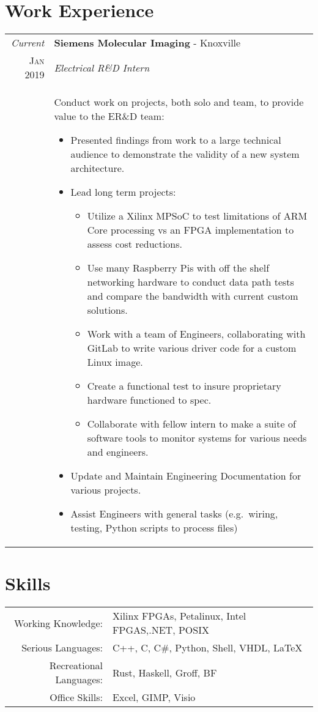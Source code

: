 \documentclass[a4paper,11pt]{article}
\begin{document}
\section{Work Experience}
\begin{tabularx}{\textwidth}{r|X}
   \emph{Current} & \textbf{Siemens Molecular Imaging} \-- Knoxville\\
   \textsc{Jan 2019} & \emph{Electrical R\&D Intern}\\
   & \small{Conduct work on projects, both solo and team, to provide value to the ER\&D team:
      \begin{itemize}[leftmargin=20pt,topsep=1pt,itemsep=0pt,partopsep=1pt, parsep=1pt]
         \item Presented findings from work to a large technical audience to demonstrate the validity of a new system architecture.
         \item Lead long term projects:
            \begin{itemize}[leftmargin=20pt,topsep=1pt,itemsep=0pt,partopsep=1pt, parsep=1pt]
               \item Utilize a Xilinx MPSoC to test limitations of ARM Core processing vs an FPGA implementation to assess cost reductions.
               \item Use many Raspberry Pis with off the shelf networking hardware to conduct data path tests and compare the bandwidth with current custom solutions.
               \item Work with a team of Engineers, collaborating with GitLab to write various driver code for a custom Linux image.
               \item Create a functional test to insure proprietary hardware functioned to spec.
               \item Collaborate with fellow intern to make a suite of software tools to monitor systems for various needs and engineers.
            \end{itemize}
         \item Update and Maintain Engineering Documentation for various projects.
         \item Assist Engineers with general tasks (e.g.\ wiring, testing, Python scripts to process files)
      \end{itemize}}\\
\end{tabularx}

\section{Skills}
\begin{tabularx}{\textwidth}{rl}
   Working Knowledge: & Xilinx FPGAs, Petalinux, Intel FPGAS,.NET, POSIX\\
   Serious Languages:& C++, C, C\#, Python, Shell, VHDL, \LaTeX{}\\
   Recreational Languages:& Rust, Haskell, Groff, BF \\
   Office Skills: & Excel, GIMP, Visio\\
\end{tabularx}
\end{document}

